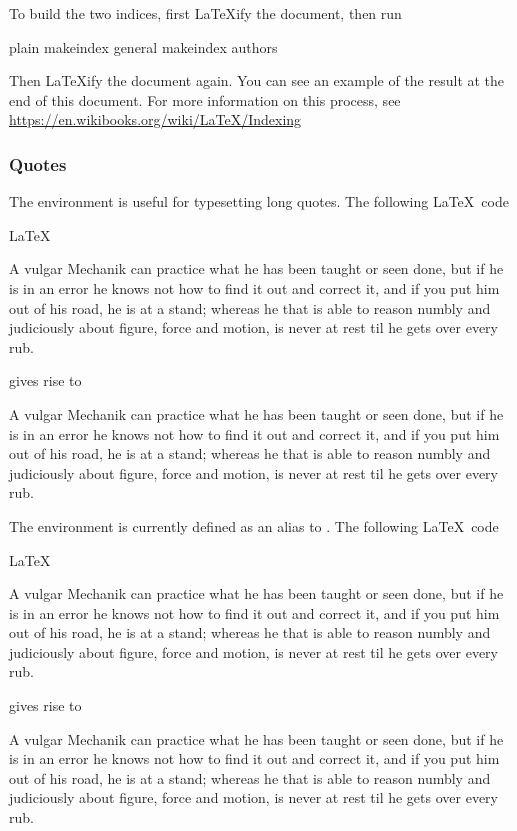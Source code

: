To build the two indices, first {\LaTeX}ify the document, then run
\begin{snippet}{plain}
makeindex general
makeindex authors
\end{snippet}
Then {\LaTeX}ify the document again. You can see an example of the result at the end of this document. For more information on this process, see \url{https://en.wikibooks.org/wiki/LaTeX/Indexing}

\subsubsection{Quotes}

The environment  is useful for typesetting long quotes. The following \LaTeX~code
\begin{snippet}{LaTeX}
\begin{longquote}
A vulgar Mechanik can practice what he has been taught or seen done, but if he is in an error he knows not how to find it out and correct it, and if you put him out of his road, he is at a stand; whereas he that is able to reason numbly and judiciously about figure, force and motion, is never at rest til he gets over every rub.
\end{longquote}
\end{snippet}
gives rise to
\begin{longquote}
A vulgar Mechanik can practice what he has been taught or seen done, but if he is in an error he knows not how to find it out and correct it, and if you put him out of his road, he is at a stand; whereas he that is able to reason numbly and judiciously about figure, force and motion, is never at rest til he gets over every rub.
\end{longquote}

The environment  is currently defined as an alias to . The following \LaTeX~code
\begin{snippet}{LaTeX}
\begin{shortquote}
A vulgar Mechanik can practice what he has been taught or seen done, but if he is in an error he knows not how to find it out and correct it, and if you put him out of his road, he is at a stand; whereas he that is able to reason numbly and judiciously about figure, force and motion, is never at rest til he gets over every rub.
\end{shortquote}
\end{snippet}
gives rise to
\begin{shortquote}
A vulgar Mechanik can practice what he has been taught or seen done, but if he is in an error he knows not how to find it out and correct it, and if you put him out of his road, he is at a stand; whereas he that is able to reason numbly and judiciously about figure, force and motion, is never at rest til he gets over every rub.
\end{shortquote}

